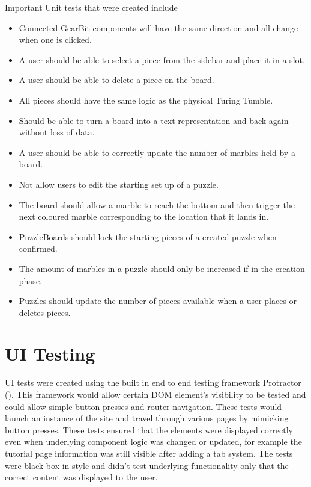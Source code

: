 \documentclass{l4proj}
\begin{document}
Important Unit tests that were created include
\begin{itemize}
    \item Connected GearBit components will have the same direction and all change when one is clicked.
    \item A user should be able to select a piece from the sidebar and place it in a slot.
    \item A user should be able to delete a piece on the board.
    \item All pieces should have the same logic as the physical Turing Tumble.
    \item Should be able to turn a board into a text representation and back again without loss of data.
    \item A user should be able to correctly update the number of marbles held by a board.
    \item Not allow users to edit the starting set up of a puzzle.
    \item The board should allow a marble to reach the bottom and then trigger the next coloured marble corresponding to the location that it lands in.
    \item PuzzleBoards should lock the starting pieces of a created puzzle when confirmed.
    \item The amount of marbles in a puzzle should only be increased if in the creation phase.
    \item Puzzles should update the number of pieces available when a user places or deletes pieces.
\end{itemize}

\section{UI Testing}
UI tests were created using the built in end to end testing framework Protractor (\cite{protractor}). This framework would allow certain DOM element's visibility to be tested and could allow simple button presses and router navigation. These tests would launch an instance of the site and travel through various pages by mimicking button presses. These tests ensured that the elements were displayed correctly even when underlying component logic was changed or updated, for example the tutorial page information was still visible after adding a tab system. The tests were black box in style and didn't test underlying functionality only that the correct content was displayed to the user. 
\end{document}

